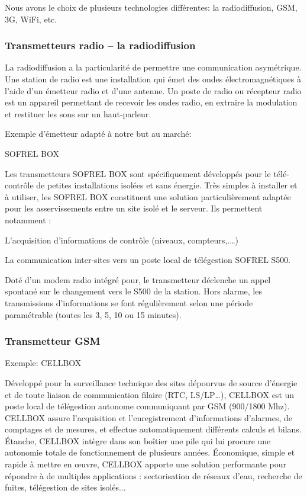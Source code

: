Nous avons le choix de plusieurs technologies différentes: la radiodiffusion, GSM, 3G, WiFi, etc.

\subsubsection{Transmetteurs radio – la radiodiffusion}

La radiodiffusion a la particularité de permettre une communication asymétrique. 
Une station de radio est une installation qui émet des ondes électromagnétiques à l'aide d'un émetteur radio et d'une antenne. 
Un poste de radio ou récepteur radio est un appareil permettant de recevoir les ondes radio, en extraire la modulation et restituer les sons sur un haut-parleur. 

Exemple d'émetteur adapté à notre but au marché: 

SOFREL BOX

\begin{figure}
\begin{center}


\end{center}
\end{figure}

Les transmetteurs SOFREL BOX sont spécifiquement développés pour le télé-contrôle de petites installations isolées et sans énergie.
Très simples à installer et à utiliser, les SOFREL BOX constituent une solution particulièrement adaptée pour les asservissements entre un site isolé et le serveur.
Ils permettent notamment :
\begin{description}
\item L’acquisition d’informations de contrôle (niveaux, compteurs,.…)
\item La communication inter-sites vers un poste local de télégestion SOFREL S500.
\end{description}
Doté d’un modem radio intégré pour, le transmetteur déclenche un appel spontané sur le changement vers le S500 de la station.
Hors alarme, les transmissions d’informations se font régulièrement selon une période paramétrable (toutes les 3, 5, 10 ou 15 minutes).

\subsubsection{Transmetteur GSM}

Exemple: CELLBOX

Développé pour la surveillance technique des sites dépourvus de source d’énergie et de toute liaison de communication filaire (RTC, LS/LP…), CELLBOX est un poste local de télégestion autonome communiquant par GSM (900/1800 Mhz).
CELLBOX assure l’acquisition et l’enregistrement d’informations d’alarmes, de comptages et de mesures, et effectue automatiquement différents calculs et bilans.
Étanche, CELLBOX intègre dans son boîtier une pile qui lui procure une autonomie totale de fonctionnement de plusieurs années.
Économique, simple et rapide à mettre en œuvre, CELLBOX apporte une solution performante pour répondre à de multiples applications : sectorisation de réseaux d’eau, recherche de fuites, télégestion de sites isolés...


